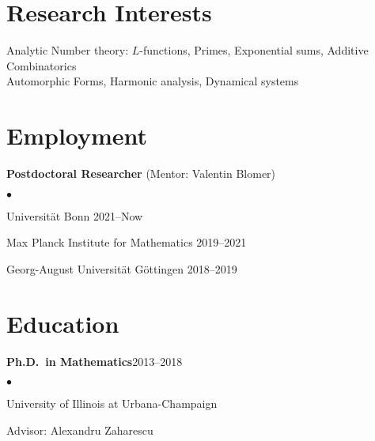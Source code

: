 \documentclass[margin,line,pifont,palatino,courier,10pt]{res}
\newenvironment{list1}{
  \begin{list}{$\bullet$}{%
      \setlength{\itemsep}{0in}
      \setlength{\parsep}{0in} \setlength{\parskip}{0in}
      \setlength{\topsep}{0in} \setlength{\partopsep}{0in}
      \setlength{\leftmargin}{0.17in}}}{\end{list}}
\begin{document}
\begin{resume}
\section{\sc Research Interests}
Analytic Number theory: $L$-functions, Primes,  Exponential sums, Additive Combinatorics\\
Automorphic Forms,
Harmonic analysis, Dynamical systems %
\section{\sc Employment} 
\textbf{Postdoctoral Researcher } (Mentor: Valentin Blomer) \\
\vspace*{-.15in}
\begin{list1}
\item []{Universit\"at Bonn }  \hfill{2021--Now} 
\item[] {Max Planck Institute for Mathematics}\hfill{ 2019--2021}
\item [] {Georg-August Universit\"at G\"ottingen} \hfill{2018--2019}
\end{list1}








\section{\sc Education}

\textbf{Ph.D.~in Mathematics}\hfill{2013--2018}\\
\vspace*{-.15in}

\begin{list1}
\item[] University of Illinois at Urbana-Champaign
\item[] Advisor: Alexandru Zaharescu


\end{list1}
\end{resume}
\end{document}

